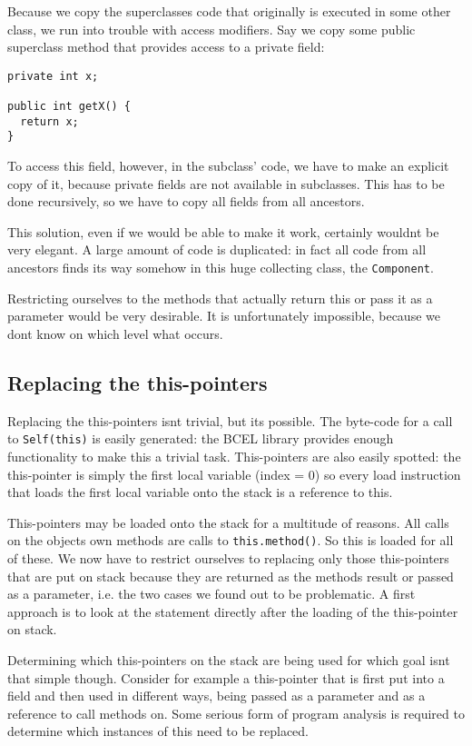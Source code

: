 \documentclass[a4paper,12pt]{book}
\begin{document}
Because we copy the superclasses code that originally is executed in some other class, we run into trouble with access modifiers. Say we copy some public superclass method that provides access to a private field:

\begin{verbatim}
private int x;

public int getX() {
  return x;
}
\end{verbatim}

To access this field, however, in the subclass' code, we have to make an explicit copy of it, because private fields are not available in subclasses. This has to be done recursively, so we have to copy all fields from all ancestors.

This solution, even if we would be able to make it work, certainly wouldnt be very elegant. A large amount of code is duplicated: in fact all code from all ancestors finds its way somehow in this huge collecting class, the \verb|Component|.

Restricting ourselves to the methods that actually return this or pass it as a parameter would be very desirable. It is unfortunately impossible, because we dont know on which level what occurs.

\subsection*{Replacing the this-pointers}
Replacing the this-pointers isnt trivial, but its possible. The byte-code for a call to \verb|Self(this)| is easily generated: the BCEL library provides enough functionality to make this a trivial task. This-pointers are also easily spotted: the this-pointer is simply the first local variable (index = 0) so every load instruction that loads the first local variable onto the stack is a reference to this.

This-pointers may be loaded onto the stack for a multitude of reasons. All calls on the objects own methods are calls to \verb|this.method()|. So this is loaded for all of these. We now have to restrict ourselves to replacing only those this-pointers that are put on stack because they are returned as the methods result or passed as a parameter, i.e. the two cases we found out to be problematic. A first approach is to look at the statement directly after the loading of the this-pointer on stack.

Determining which this-pointers on the stack are being used for which goal isnt that simple though. Consider for example a this-pointer that is first put into a field and then used in different ways, being passed as a parameter and as a reference to call methods on. Some serious form of program analysis is required to determine which instances of this need to be replaced.
\end{document}
